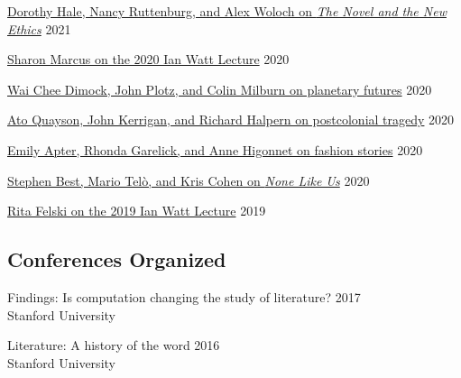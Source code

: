\documentclass[
  12pt,
  letterpaper,
]{article}
\begin{document}
\href{https://web.archive.org/web/20220429093353/https://novel.stanford.edu/csn-cafe/2021/7/23/books-at-the-center-dorothy-hale-the-novel-and-the-new-ethics-11521}{Dorothy
Hale, Nancy Ruttenburg, and Alex Woloch on \emph{The Novel and the New
Ethics}} \hfill 2021

\href{https://web.archive.org/web/20220429093326/https://novel.stanford.edu/csn-cafe/2021/7/23/sharon-marcus-on-her-ian-watt-lecture-103020}{Sharon
Marcus on the 2020 Ian Watt Lecture} \hfill 2020

\href{https://web.archive.org/web/20220429010109/https://novel.stanford.edu/csn-cafe/2021/7/23/wai-chee-dimock-john-plotz-and-colin-milburn-on-the-literature-of-planetary-futures-52319}{Wai
Chee Dimock, John Plotz, and Colin Milburn on planetary futures}
\hfill 2020

\href{https://web.archive.org/web/20220429010041/https://novel.stanford.edu/csn-cafe/2021/7/23/ato-quayson-john-kerrigan-and-richard-halpern-on-postcolonial-tragedy-91519}{Ato
Quayson, John Kerrigan, and Richard Halpern on postcolonial tragedy}
\hfill 2020

\href{https://web.archive.org/web/20220429093237/https://novel.stanford.edu/csn-cafe/2021/7/23/fashion-stories-emily-apter-rhonda-garelick-and-anne-higonnet-on-the-cultural-history-of-clothing-1920}{Emily
Apter, Rhonda Garelick, and Anne Higonnet on fashion stories}
\hfill 2020

\href{https://web.archive.org/web/20220429093211/https://novel.stanford.edu/csn-cafe/2021/7/23/books-at-the-center-stephen-best-mario-tel-and-kris-cohen-on-none-like-us-101019}{Stephen
Best, Mario Telò, and Kris Cohen on \emph{None Like Us}} \hfill 2020

\href{https://web.archive.org/web/20220429093144/https://novel.stanford.edu/csn-cafe/2021/7/23/rita-felski-on-her-2019-ian-watt-lecture-5319}{Rita
Felski on the 2019 Ian Watt Lecture} \hfill 2019

\hypertarget{conferences-organized}{%
\subsection{Conferences Organized}\label{conferences-organized}}

Findings: Is computation changing the study of literature? \hfill 2017\\
Stanford University

Literature: A history of the word \hfill 2016\\
Stanford University
\end{document}
